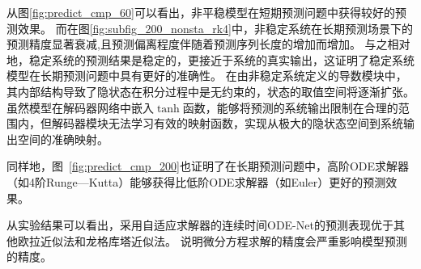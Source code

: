 从图\ref{fig:predict_cmp_60}可以看出，非平稳模型在短期预测问题中获得较好的预测效果。
而在图\ref{fig:subfig_200_nonsta_rk4}中，非稳定系统在长期预测场景下的预测精度显著衰减,且预测偏离程度伴随着预测序列长度的增加而增加。
与之相对地，稳定系统的预测结果是稳定的，更接近于系统的真实输出，这证明了稳定系统模型在长期预测问题中具有更好的准确性。
在由非稳定系统定义的导数模块中，其内部结构导致了隐状态在积分过程中是无约束的，状态的取值空间将逐渐扩张。
虽然模型在解码器网络中嵌入$\tanh$函数，能够将预测的系统输出限制在合理的范围内，但解码器模块无法学习有效的映射函数，实现从极大的隐状态空间到系统输出空间的准确映射。

同样地，图~\ref{fig:predict_cmp_200}也证明了在长期预测问题中，高阶ODE求解器（如4阶Runge—Kutta）能够获得比低阶ODE求解器（如Euler）更好的预测效果。








从实验结果可以看出，采用自适应求解器的连续时间ODE-Net的预测表现优于其他欧拉近似法和龙格库塔近似法。
说明微分方程求解的精度会严重影响模型预测的精度。

